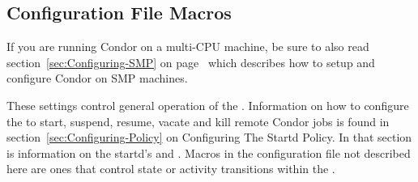 \subsection{\label{sec:Startd-Config-File-Entries}
 Configuration File Macros}

\Note If you are running Condor on a multi-CPU machine, be sure
to also read section~\ref{sec:Configuring-SMP} on
page~\pageref{sec:Configuring-SMP} which describes how to setup and
configure Condor on SMP machines.

These settings control general operation of the .
Information on how to configure the  to start, suspend,
resume, vacate and kill remote Condor jobs is found in
section~\ref{sec:Configuring-Policy} on
Configuring The Startd Policy.  In that section is
information on the startd's  and .
Macros in the configuration file not described here are ones that
control state or activity transitions within the
.

